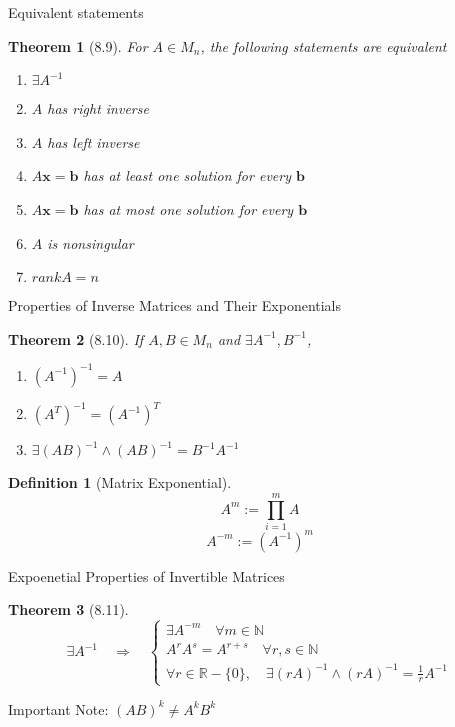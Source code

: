 \documentclass[a4paper,11pt]{article}
\newtheorem{defn}{Definition}
\newtheorem{thm}{Theorem}
\begin{document}
\begin{frame}[t]{Equivalent statements}
	\begin{thm}
		[8.9] For $A\in M_n$, the following statements are equivalent
		\begin{enumerate}
			\item $\exists A^{-1}$
			\item $A$ has right inverse
			\item $A$ has left inverse
			\item $A\mathbf{x}=\mathbf{b}$ has at least one solution for every $\mathbf{b}$
			\item $A\mathbf{x}=\mathbf{b}$ has at most one solution for every $\mathbf{b}$
			\item $A$ is nonsingular
			\item $rank A = n$
		\end{enumerate}
	\end{thm}
\end{frame}

\begin{frame}[t]{Properties of Inverse Matrices and Their Exponentials}
	\begin{thm}
		[8.10] If $A,B\in M_n$ and $\exists A^{-1}, B^{-1}$,
		\begin{enumerate}
			\item $(A^{-1})^{-1}=A$
			\item $(A^T)^{-1}=(A^{-1})^T$
			\item $\exists(AB)^{-1} \land (AB)^{-1}=B^{-1}A^{-1}$
		\end{enumerate}
	\end{thm}
	\begin{defn}
		[Matrix Exponential]
		\[
			A^m := \prod_{i=1}^m A
		\]\[
			A^{-m} := (A^{-1})^m
		\]
	\end{defn}
\end{frame}

\begin{frame}[t]{Expoenetial Properties of Invertible Matrices}
	\begin{thm}
		[8.11] \[
			\exists A^{-1} \quad\Rightarrow\quad \begin{cases}
				\exists A^{-m} \quad\forall m\in\mathbb{N}\\
				A^rA^s = A^{r+s}\quad\forall r,s\in\mathbb{N}\\
				\forall r\in\mathbb{R}-\{0\}, \quad \exists(rA)^{-1}\land (rA)^{-1}=\frac{1}{r}A^{-1}
			\end{cases}
		\]
	\end{thm}
	Important Note: $(AB)^k\neq A^k B^k$
\end{frame}
\end{document}
